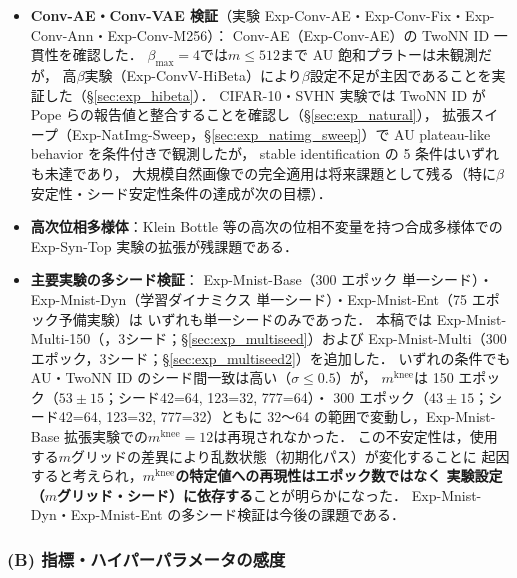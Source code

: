 \documentclass[11pt,a4paper]{jsarticle}
\newcommand{\mknee}{m^{\mathrm{knee}}}
\begin{document}
\begin{itemize}
  \item \textbf{Conv-AE・Conv-VAE 検証}（実験 Exp-Conv-AE・Exp-Conv-Fix・Exp-Conv-Ann・Exp-Conv-M256）：
        Conv-AE（Exp-Conv-AE）の TwoNN ID 一貫性を確認した．
        $\beta_{\max}=4$では$m \leq 512$まで AU 飽和プラトーは未観測だが，
        高$\beta$実験（Exp-ConvV-HiBeta）により$\beta$設定不足が主因であることを実証した（§\ref{sec:exp_hibeta}）．
        CIFAR-10・SVHN 実験では TwoNN ID が Pope ら\cite{pope2021intrinsic}の報告値と整合することを確認し（§\ref{sec:exp_natural}），
        拡張スイープ（Exp-NatImg-Sweep，§\ref{sec:exp_natimg_sweep}）で AU plateau-like behavior を条件付きで観測したが，
        stable identification の 5 条件はいずれも未達であり，
        大規模自然画像での完全適用は将来課題として残る（特に$\beta$安定性・シード安定性条件の達成が次の目標）．
  \item \textbf{高次位相多様体}：Klein Bottle 等の高次の位相不変量を持つ合成多様体での
        Exp-Syn-Top 実験の拡張が残課題である．
  \item \textbf{主要実験の多シード検証}：
        Exp-Mnist-Base（300 エポック 単一シード）・Exp-Mnist-Dyn（学習ダイナミクス 単一シード）・Exp-Mnist-Ent（75 エポック予備実験）は
        いずれも単一シードのみであった．
        本稿では Exp-Mnist-Multi-150（，3シード；§\ref{sec:exp_multiseed}）および
        Exp-Mnist-Multi（300 エポック，3シード；§\ref{sec:exp_multiseed2}）を追加した．
        いずれの条件でも AU・TwoNN ID のシード間一致は高い（$\sigma \leq 0.5$）が，
        $\mknee$は 150 エポック（$53 \pm 15$；シード42=64, 123=32, 777=64）・
        300 エポック（$43 \pm 15$；シード42=64, 123=32, 777=32）ともに
        32〜64 の範囲で変動し，Exp-Mnist-Base 拡張実験での$\mknee = 12$は再現されなかった．
        この不安定性は，使用する$m$グリッドの差異により乱数状態（初期化パス）が変化することに
        起因すると考えられ，\textbf{$\mknee$の特定値への再現性はエポック数ではなく
        実験設定（$m$グリッド・シード）に依存する}ことが明らかになった．
        Exp-Mnist-Dyn・Exp-Mnist-Ent の多シード検証は今後の課題である．
\end{itemize}

\subsubsection*{(B) 指標・ハイパーパラメータの感度}
\end{document}
